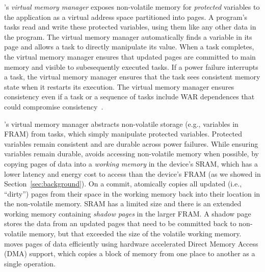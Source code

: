 
\sys's {\em virtual memory manager} exposes non-volatile memory for
\emph{protected} variables to the application as a virtual address space
partitioned into pages.
%
A program's tasks read and write these protected variables, using them like any
other data in the program.
%
The virtual memory manager automatically finds a variable in its page and
allows a task to directly manipulate its value.
%
When a task completes, the virtual memory manager ensures that updated pages
are committed to main memory and visible to subesequently executed tasks.
%
If a power failure interrupts a task, the virtual memory manager ensures that
the task sees consistent memory state when it restarts its execution.
%
The virtual memory manager ensures consistency even if a task or a sequence of tasks include WAR dependences that could compromise consistency~\cite{ratchet,dino}.
%
%
%
%

\sys's virtual memory manager \sys abstracts non-volatile storage (e.g.,
variables in FRAM) from tasks, which simply manipulate protected variables.
%
Protected variables remain consistent and are durable across power failures.
%
While ensuring variables remain durable, \sys avoids accessing non-volatile
memory when possible, by copying pages of data into a {\em working memory} in the device's SRAM, which
has a lower latency and energy cost to access than the device's FRAM (as we
showed in Section~\ref{sec:background}).
%
%
On a commit, \sys atomically copies all updated (i.e., ``dirty'') pages from their
space in the working memory back into their location in the non-volatile
memory.
%
SRAM has a limited size and there is an extended working memory containing {\em
shadow pages} in the larger FRAM.  A shadow page stores the data from an
updated pages that need to be committed back to non-volatile memory, but that
exceeded the size of the volatile working memory.
%
\sys moves pages of data efficiently using hardware accelerated Direct Memory
Access (DMA) support, which copies a block of memory from one place to another
as a single operation.

